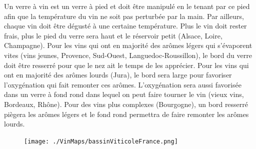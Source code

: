 \medskip
Un verre à vin est un verre à pied et doit être manipulé en le tenant par ce pied afin que la température du vin ne soit pas perturbée par la main. Par ailleurs, chaque vin doit être dégusté à une certaine température. Plus le vin doit rester frais, plus le pied du verre sera haut et le réservoir petit (Alsace, Loire, Champagne). Pour les vins qui ont en majorité des arômes légers qui s’évaporent vites (vins jeunes, Provence, Sud-Ouest, Languedoc-Roussillon), le bord du verre doit être resserré pour que le nez ait le temps de les apprécier. Pour les vins qui ont en majorité des arômes lourds (Jura), le bord sera large pour favoriser l’oxygénation qui fait remonter ces arômes. L’oxygénation sera aussi favorisée dans un verre à fond rond dans lequel on peut faire tourner le vin (vieux vins, Bordeaux, Rhône). Pour des vins plus complexes (Bourgogne), un bord resserré piègera les arômes légers et le fond rond permettra de faire remonter les arômes lourds.
\begin{figure}[!t]
\texttt{[image: ./VinMaps/bassinViticoleFrance.png]}
\end{figure}

